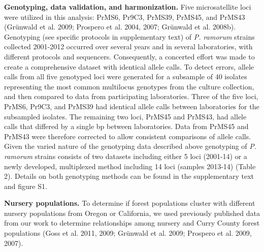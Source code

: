 \documentclass[double,12pt]{beavtex}
\begin{document}
  \textbf{Genotyping, data validation, and harmonization.} Five
  microsatellite loci were utilized in this analysis: PrMS6, Pr9C3,
  PrMS39, PrMS45, and PrMS43 (Grünwald et al. 2009; Prospero et al. 2004,
  2007; Grünwald et al. 2008b). Genotyping (see specific protocols in
  supplementary text) of \emph{P. ramorum} strains collected 2001-2012
  occurred over several years and in several laboratories, with different
  protocols and sequencers. Consequently, a concerted effort was made to
  create a comprehensive dataset with identical allele calls. To detect
  errors, allele calls from all five genotyped loci were generated for a
  subsample of 40 isolates representing the most common multilocus
  genotypes from the culture collection, and then compared to data from
  participating laboratories. Three of the five loci, PrMS6, Pr9C3, and
  PrMS39 had identical allele calls between laboratories for the
  subsampled isolates. The remaining two loci, PrMS45 and PrMS43, had
  allele calls that differed by a single bp between laboratories. Data
  from PrMS45 and PrMS43 were therefore corrected to allow consistent
  comparisons of allele calls. Given the varied nature of the genotyping
  data described above genotyping of \emph{P. ramorum} strains consists of
  two datasets including either 5 loci (2001-14) or a newly developed,
  multiplexed method including 14 loci (samples 2013-14) (Table 2).
  Details on both genotyping methods can be found in the supplementary
  text and figure S1.
  
  \textbf{Nursery populations.} To determine if forest populations cluster
  with different nursery populations from Oregon or California, we used
  previously published data from our work to determine relationships among
  nursery and Curry County forest populations (Goss et al. 2011, 2009;
  Grünwald et al. 2009; Prospero et al. 2009, 2007).
  
\end{document}

